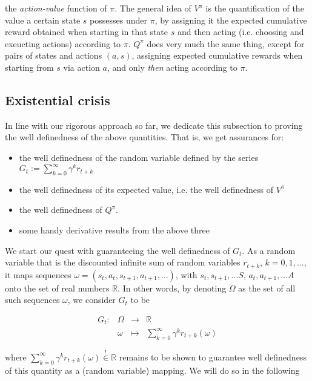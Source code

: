 \documentclass[11pt]{article} %
\begin{document}
the \textit{action-value} function of $\pi$. The general idea of $V^{\pi}$ is the quantification of the value a certain state $s$ possesses under $\pi$, by assigning it the expected cumulative reward obtained when starting in that state $s$ and then acting (i.e. choosing and exeucting actions) according to $\pi$. $Q^{\pi}$ does very much the same thing, except for pairs of states and actions $(a,s)$, assigning expected cumulative rewards when starting from $s$ via action $a$, and only \textit{then} acting according to $\pi$.

\subsection{Existential crisis}

In line with our rigorous approach so far, we dedicate this subsection to proving the well definedness of the above quantities. That is, we get assurances for:

\begin{itemize}
	\item the well definedness of the random variable defined by the series $G_t := \sum_{k=0}^{\infty}\gamma^k r_{t+k}$
	\item the well definedness of its expected value, i.e. the well definedness of $V^{\pi}$
	\item the well definedness of $Q^{\pi}$.
	\item some handy derivative results from the above three 
\end{itemize}

We start our quest with guaranteeing the well definedness of $G_t$. As a random variable that is the discounted infinite sum of random variables $r_{t+k}$, $k=0,1,\dots$, it maps sequences $\omega = (s_t, a_t, s_{t+1}, a_{t+1}, \dots ) $, with $s_t,s_{t+1},\dots S$, $a_t, a_{t+1},\dots A$ onto the set of real numbers $\mathbb{R}$. In other words, by denoting $\Omega$ as the set of all such sequences $\omega$, we consider $G_t$ to be

\begin{equation}
	\begin{array}{rlll}\label{ar_cumRew}
		G_t: 	& \Omega 		& \rightarrow 	& \mathbb{R} \\
			&	\omega	& \mapsto 	& \sum_{k=0}^{\infty} \gamma^k r_{t+k}(\omega)
	\end{array}
\end{equation}

where $\sum_{k=0}^{\infty} \gamma^k r_{t+k}(\omega) \overset{!}{\in} \mathbb{R}$ remains to be shown to guarantee well definedness of this quantity as a (random variable) mapping. We will do so in the following
\end{document}

